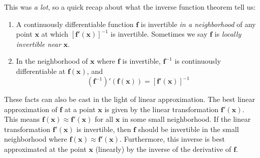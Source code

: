 \documentclass{article}
\newcommand{\x}{\mathbf{x}}
\newcommand{\f}{\mathbf{f}}
\theoremstyle{definition}
\begin{document}
	This was \textit{a lot}, so a quick recap about what the inverse function theorem  tell us:
	\begin{enumerate}
		\item A continuously differentiable function $ \f $ is invertible \textit{in a neighborhood} of any point $ \x $ at which $ [\f'(\x)]^{-1} $ is invertible. Sometimes we say $ \f $ is \textit{\color{red}locally invertible near $ \x $}. 
		\item In the neighborhood of $ \x $ where $ \f $ is invertible, $ \f^{-1} $ is continuously differentiable at $ \f(\x) $, and 
		$$ (\f^{-1})'(\f(\x)) = [\f'(\x)]^{-1}$$
	\end{enumerate}
	These facts can also be cast in the light of linear approximation. The best linear approximation of $ \f $ at a point $ \x $ is given by the linear transformation $ \f'(\x) $. This means $ \f(\x) \approx \f'(\x) $ for all $ \x $ in some small neighborhood. If the linear transformation $ \f'(\x) $ is invertible, then $ \f $ should be invertible in the small neighborhood where $ \f(\x) \approx \f'(\x) $. Furthermore, this inverse is best approximated at the point $ \x $ (linearly) by the inverse of the derivative of $ \f $. 
\end{document}
